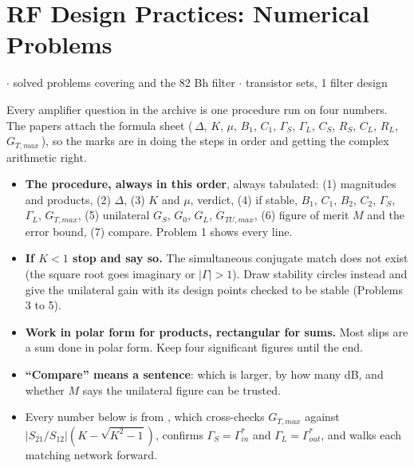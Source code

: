 \section{RF Design Practices: Numerical Problems}
{\color{sub}\footnotesize {} \gap$\cdot$ solved problems covering 
and the 82 Bh filter \gap$\cdot$ transistor sets, 1 filter design}

\vspace{3pt}\noindent
\colorbox{gdL}{\makebox[\dimexpr\textwidth-2\fboxsep][l]{%
  \textcolor{gd}{\bfseries\footnotesize READ THIS FIRST}}}
\par\nobreak\vspace{3pt}

Every amplifier question in the archive is one procedure run on four numbers. The papers attach
the formula sheet (\,$\Delta$, $K$, $\mu$, $B_1$, $C_1$, $\Gamma_S$, $\Gamma_L$, $C_S$, $R_S$,
$C_L$, $R_L$, $G_{T,max}$\,), so the marks are in doing the steps in order and getting the
complex arithmetic right.
\begin{itemize}
  \item \textbf{The procedure, always in this order}, always tabulated:
    (1) magnitudes and products, (2) $\Delta$, (3) $K$ and $\mu$, verdict,
    (4) if stable, $B_1$, $C_1$, $B_2$, $C_2$, $\Gamma_S$, $\Gamma_L$, $G_{T,max}$,
    (5) unilateral $G_S$, $G_0$, $G_L$, $G_{TU,max}$, (6) figure of merit $M$ and the error
    bound, (7) compare. Problem 1 shows every line.
  \item \textbf{If $K < 1$ stop and say so.} The simultaneous conjugate match does not exist
    (the square root goes imaginary or $|\Gamma| > 1$). Draw stability circles instead and
    give the unilateral gain with its design points checked to be stable (Problems 3 to 5).
  \item \textbf{Work in polar form for products, rectangular for sums.} Most slips are a
    sum done in polar form. Keep four significant figures until the end.
  \item \textbf{``Compare'' means a sentence}: which is larger, by how many dB, and whether
    $M$ says the unilateral figure can be trusted.
  \item Every number below is from , which cross-checks $G_{T,max}$
    against $|S_{21}/S_{12}|(K - \sqrt{K^2-1})$, confirms $\Gamma_S = \Gamma_{in}^*$ and
    $\Gamma_L = \Gamma_{out}^*$, and walks each matching network forward.
\end{itemize}

\vspace{2pt}



